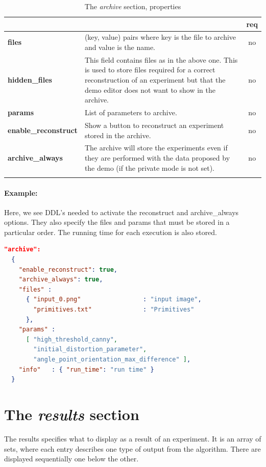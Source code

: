 \begin{longtable}{|>{\bf}L{\linewidth}|L{\linewidth}|c|}
\hline
{}     &  & {\bf req} \tabularnewline 
\hline \hline
 files    & (key, value) pairs where key is the file to archive and value is the name. & no \\ \hline
hidden\_files    & This field contains files as in the above one. This is used to store files required for a correct reconstruction of an experiment but that the demo editor does not want to show in the archive. & no \\ \hline            
 params  & List of parameters to archive. & no \\ \hline
 enable\_reconstruct & Show a button to reconstruct an experiment stored in the archive. & no \\ \hline
 archive\_always     & The archive will store the experiments even if they are performed with the data proposed by the demo (if the private mode is not set). & no \\ \hline
\caption{The \emph{archive} section, properties}
\end{longtable}


\paragraph{Example:}
Here, we see DDL's needed to activate the reconstruct and archive\_always options. They also specify the files and params that must be stored in a particular order. The running time for each execution is also stored.
\\
\begin{lstlisting}[language=json,firstnumber=1]
"archive":
  {
    "enable_reconstruct": true,
    "archive_always": true,
    "files" : 
      { "input_0.png"                 : "input image",
        "primitives.txt"              : "Primitives"
      },
    "params" :  
      [ "high_threshold_canny", 
        "initial_distortion_parameter", 
        "angle_point_orientation_max_difference" ],
    "info"   : { "run_time": "run time" }
  }
\end{lstlisting}

\section{The \emph{results} section}

The results specifies what to display as a result of an experiment. It is an array of sets, where each entry describes one type of output from the algorithm. There are displayed sequentially one below the other.

